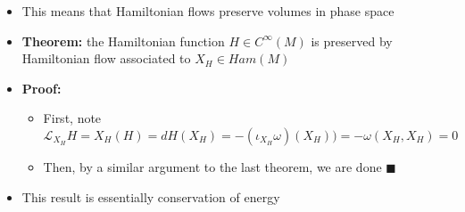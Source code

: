\documentclass[12pt,a4paper]{article}
\numberwithin{equation}{section}
\begin{document}
\begin{itemize}
		\item This means that Hamiltonian flows preserve volumes in phase space
		\item \textbf{Theorem:} the Hamiltonian function $H\in C^{\infty}(M)$ is preserved by Hamiltonian flow associated to $X_{H}\in Ham(M)$
		\item \textbf{Proof:}
		\begin{itemize}
			\item First, note
			\begin{equation}
				\mathcal{L}_{X_{H}}H=X_{H}(H)=dH(X_{H})=-(\iota_{X_{H}}\omega)(X_{H}))=-\omega(X_{H},X_{H})=0
			\end{equation}
			\item Then, by a similar argument to the last theorem, we are done $\blacksquare$
		\end{itemize}
		\item This result is essentially conservation of energy
	\end{itemize}
\end{document}
